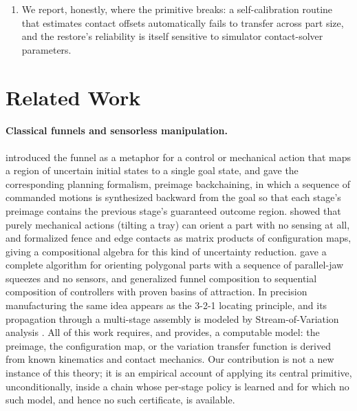 \documentclass[11pt]{article}
\begin{document}
\begin{enumerate}[leftmargin=*]
  $N=12$: restore holds every stage within roughly 1 to 8~mm for about
  eight stages and then fails entirely, because late-stage restores in the
  far row shove the already-finished part of the block by 2 to 35~mm. We
  trace this to a geometric limit of the push primitive against a
  structure it has already built, not to the placement policy, and name
  it explicitly rather than reporting only the success numbers.
  \item We report, honestly, where the primitive breaks: a self-calibration
  routine that estimates contact offsets automatically fails to transfer
  across part size, and the restore's reliability is itself sensitive to
  simulator contact-solver parameters.
\end{enumerate}

\section{Related Work}

\paragraph{Classical funnels and sensorless manipulation.}
\citet{mason1985} introduced the funnel as a metaphor for a control or
mechanical action that maps a region of uncertain initial states to a single
goal state, and \citet{lozanoperez1984} gave the corresponding planning
formalism, preimage backchaining, in which a sequence of commanded motions
is synthesized backward from the goal so that each stage's preimage contains
the previous stage's guaranteed outcome region. \citet{erdmann1988} showed
that purely mechanical actions (tilting a tray) can orient a part with no
sensing at all, and \citet{peshkin1988} formalized fence and edge contacts as
matrix products of configuration maps, giving a compositional algebra for
this kind of uncertainty reduction. \citet{goldberg1993} gave a complete
algorithm for orienting polygonal parts with a sequence of parallel-jaw
squeezes and no sensors, and \citet{burridge1999} generalized funnel
composition to sequential composition of controllers with proven basins of
attraction. In precision manufacturing the same idea appears as the 3-2-1
locating principle, and its propagation through a multi-stage assembly is
modeled by Stream-of-Variation analysis \citep{jinshi1999,shi2006}. All of
this work requires, and provides, a computable model: the preimage, the
configuration map, or the variation transfer function is derived from known
kinematics and contact mechanics. Our contribution is not a new instance of
this theory; it is an empirical account of applying its central primitive,
unconditionally, inside a chain whose per-stage policy is learned and for
which no such model, and hence no such certificate, is available.
\end{document}

